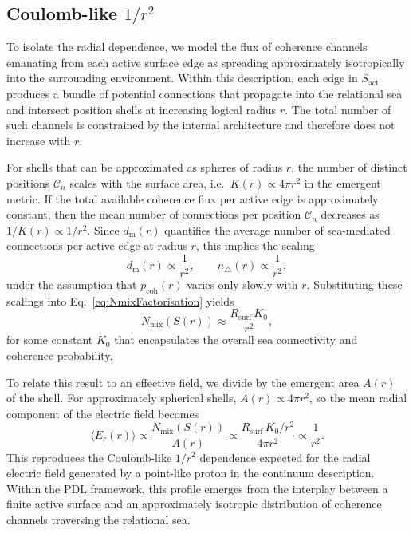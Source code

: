 \documentclass[11pt,a4paper]{article}
\begin{document}
\subsection{Coulomb-like \texorpdfstring{$1/r^{2}$}{Coulomb-like behaviour}}

To isolate the radial dependence, we model the flux of coherence channels emanating from each active surface edge as spreading approximately isotropically into the surrounding environment.
Within this description, each edge in $S_{\mathrm{act}}$ produces a bundle of potential connections that propagate into the relational sea and intersect position shells at increasing logical radius $r$.\cite{Laubscher2026SchrodingerSketch}
The total number of such channels is constrained by the internal architecture and therefore does not increase with $r$.

For shells that can be approximated as spheres of radius $r$, the number of distinct positions $\mathcal{C}_{n}$ scales with the surface area, i.e.\ $K(r)\propto 4\pi r^{2}$ in the emergent metric.
If the total available coherence flux per active edge is approximately constant, then the mean number of connections per position $\mathcal{C}_{n}$ decreases as $1/K(r)\propto 1/r^{2}$.
Since $d_{\mathrm{m}}(r)$ quantifies the average number of sea-mediated connections per active edge at radius $r$, this implies the scaling
\begin{equation}
d_{\mathrm{m}}(r) \propto \frac{1}{r^{2}},
\qquad
n_{\triangle}(r) \propto \frac{1}{r^{2}},
\label{eq:densityScaling}
\end{equation}
under the assumption that $p_{\mathrm{coh}}(r)$ varies only slowly with $r$.
Substituting these scalings into Eq.~\eqref{eq:NmixFactorisation} yields
\begin{equation}
N_{\mathrm{mix}}(S(r)) \approx \frac{R_{\mathrm{surf}}\,K_{0}}{r^{2}},
\label{eq:NmixScaling}
\end{equation}
for some constant $K_{0}$ that encapsulates the overall sea connectivity and coherence probability.

To relate this result to an effective field, we divide by the emergent area $A(r)$ of the shell.
For approximately spherical shells, $A(r)\propto 4\pi r^{2}$, so the mean radial component of the electric field becomes
\[
\langle E_{r}(r)\rangle 
\propto \frac{N_{\mathrm{mix}}(S(r))}{A(r)}
\propto \frac{R_{\mathrm{surf}}\,K_{0}/r^{2}}{4\pi r^{2}}
\propto \frac{1}{r^{2}}.
\]
This reproduces the Coulomb-like $1/r^{2}$ dependence expected for the radial electric field generated by a point-like proton in the continuum description.
Within the PDL framework, this profile emerges from the interplay between a finite active surface and an approximately isotropic distribution of coherence channels traversing the relational sea.\cite{Laubscher2026SchrodingerPDL}
\end{document}
